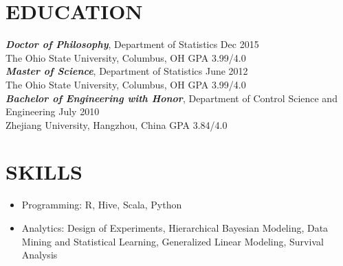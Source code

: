 \documentclass[10pt]{res} %
\begin{document}
\begin{resume}


\section{EDUCATION}

\vspace{6pt} %

{\sl {\bf Doctor of Philosophy}},
Department of Statistics \hfill Dec 2015 \\
The Ohio State University, Columbus, OH \hfill GPA 3.99/4.0 \\
{\sl {\bf Master of Science}}, Department of Statistics \hfill June 2012 \\
The Ohio State University, Columbus, OH  \hfill GPA 3.99/4.0 \\
{\sl {\bf Bachelor of Engineering with Honor}}, Department of Control
Science and Engineering \hfill July 2010 \\
Zhejiang University, Hangzhou, China   \hfill GPA 3.84/4.0

\section{SKILLS}

\vspace{15pt} %

\begin{itemize}\itemsep -2pt %
\item Programming: R, Hive, Scala, Python
\item Analytics: Design of Experiments, Hierarchical Bayesian Modeling, Data Mining and Statistical Learning, Generalized Linear Modeling, Survival Analysis
\end{itemize}

\end{resume}
\end{document}

